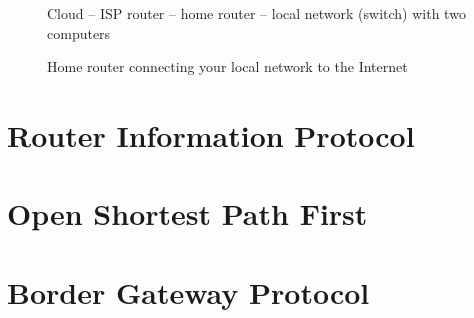 \begin{figure}
   \centering
   Cloud -- ISP router -- home router -- local network (switch) with two computers
   \caption{Home router connecting your local network to the Internet}
   \label{fig:routing-home-network}
\end{figure}


\section{Router Information Protocol}

\section{Open Shortest Path First}

\section{Border Gateway Protocol}

